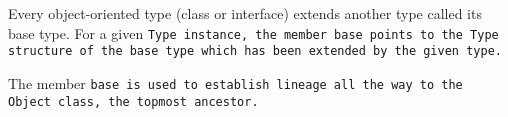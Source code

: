 Every object-oriented type (class or interface)
extends another type called its base type.
For a given \tt{Type} instance, the member \tt{base} points to the \tt{Type}
structure of the base type which has been extended by the given type.

\note The member \tt{base} is used to establish lineage
all the way to the \tt{Object} class, the topmost ancestor.
